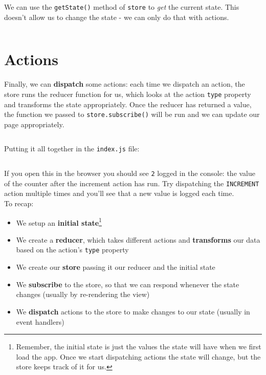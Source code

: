 We can use the \texttt{getState()} method of \texttt{store} to \textit{get} the current state. This doesn't allow us to change the state - we can only do that with actions.

\inputminted{jsx}{01/figures/02/06-subscribe.js}



\section{Actions}

Finally, we can \textbf{dispatch} some actions: each time we dispatch an action, the store runs the reducer function for us, which looks at the action \texttt{type} property and transforms the state appropriately. Once the reducer has returned a value, the function we passed to \texttt{store.subscribe()} will be run and we can update our page appropriately.

\inputminted{jsx}{01/figures/02/07-dispatch.js}

\hr


Putting it all together in the \texttt{index.js} file:

\inputminted{jsx}{01/figures/02/08-all.js}

If you open this in the browser you should see \texttt{2} logged in the console: the value of the counter after the increment action has run. Try dispatching the \texttt{INCREMENT} action multiple times and you'll see that a new value is logged each time.
\\

To recap:

\begin{itemize}
    \item We setup an \textbf{initial state}\footnote{Remember, the initial state is just the values the state will have when we first load the app. Once we start dispatching actions the state will change, but the store keeps track of it for us.}
    \item We create a \textbf{reducer}, which takes different actions and \textbf{transforms} our data based on the action's \texttt{type} property
    \item We create our \textbf{store} passing it our reducer and the initial state
    \item We \textbf{subscribe} to the store, so that we can respond whenever the state changes (usually by re-rendering the view)
    \item We \textbf{dispatch} actions to the store to make changes to our state (usually in event handlers)
\end{itemize}

